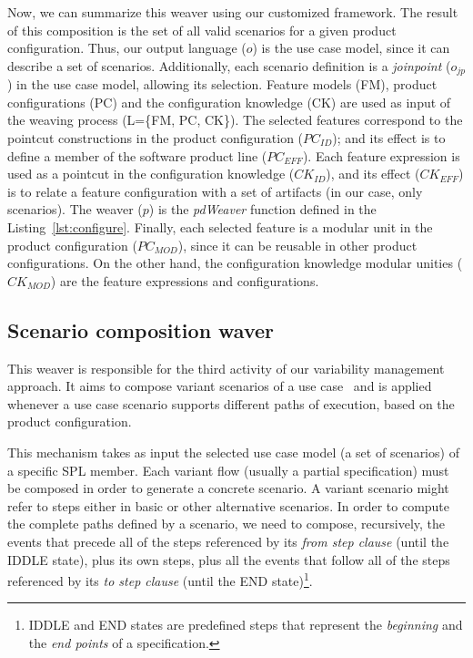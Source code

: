 Now, we can summarize this weaver using our customized framework. The
result of this composition is the set of all valid scenarios for a
given product configuration. Thus, our output language ($o$) is the
use case model, since it can describe a set of scenarios.
Additionally, each scenario definition is a \emph{joinpoint}
($o_{jp}$) in the use case model, allowing its selection. Feature models (FM),
product configurations (PC) and the configuration knowledge (CK) are used
as input of the weaving process (L=\{FM, PC, CK\}). 
The selected features correspond to the pointcut constructions in the 
product configuration ($PC_{ID}$); and
its effect is to define a member of the software product
line ($PC_{EFF}$). Each feature expression is used as a pointcut in
the configuration knowledge ($CK_{ID}$), and its effect ($CK_{EFF}$) is to relate
a feature configuration with a set of artifacts (in our case, only
scenarios). The weaver ($p$) is the \emph{pdWeaver}
function defined in the Listing~\ref{lst:configure}. Finally, each
selected feature is a modular unit in the product configuration
($PC_{MOD}$), since it can be reusable in other product
configurations. On the other hand, the configuration knowledge
modular unities ($CK_{MOD}$) are the feature expressions and
configurations.


\subsection{Scenario composition waver}\label{sub:sc-weaver}

This weaver is responsible for the third activity of our variability management 
approach. It aims to compose variant scenarios of a use case~\cite{gcabral-sbmf-2006} and 
is applied whenever a use case scenario supports different paths of execution, based on the product configuration.

This mechanism takes as
input the selected use case model (a set of scenarios) of a specific SPL member.
Each variant flow (usually a partial specification) must be composed 
in order to generate a concrete scenario. A variant scenario 
might refer to steps either in basic or other alternative scenarios. In order
to compute the complete paths defined by a scenario, we need to compose,
recursively, the events that precede all of the steps referenced by its \emph{from step
clause} (until the IDDLE state), plus its own steps, plus all the
events that follow all of the steps referenced by its \emph{to step clause} (until the END
state)\footnote{IDDLE and END states are predefined steps that
represent the \emph{beginning} and the \emph{end points} of a
specification.}. 

